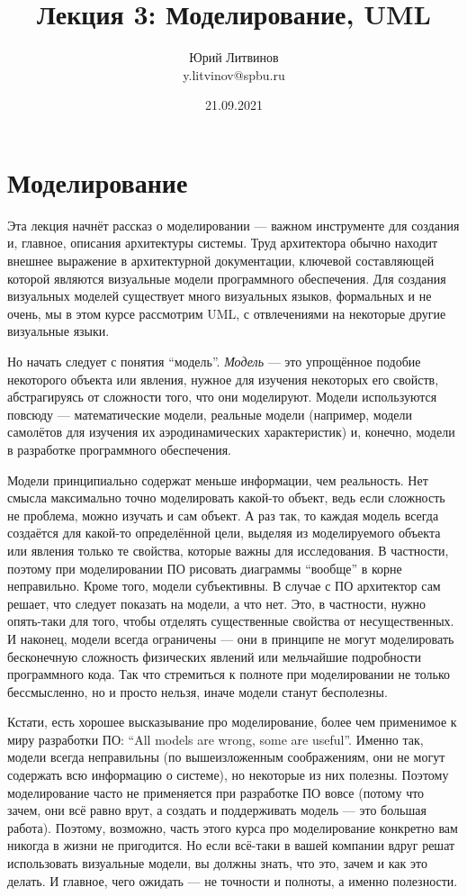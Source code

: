 \documentclass[a5paper]{article}
\title{Лекция 3: Моделирование, UML}
\author{Юрий Литвинов\\\small{y.litvinov@spbu.ru}}
\date{21.09.2021}
\begin{document}
\maketitle
\thispagestyle{empty}

\section{Моделирование}

Эта лекция начнёт рассказ о моделировании --- важном инструменте для создания и, главное, описания архитектуры системы. Труд архитектора обычно находит внешнее выражение в архитектурной документации, ключевой составляющей которой являются визуальные модели программного обеспечения. Для создания визуальных моделей существует много визуальных языков, формальных и не очень, мы в этом курсе рассмотрим UML, с отвлечениями на некоторые другие визуальные языки.

Но начать следует с понятия ``модель''. \textit{Модель} --- это упрощённое подобие некоторого объекта или явления, нужное для изучения некоторых его свойств, абстрагируясь от сложности того, что они моделируют. Модели используются повсюду --- математические модели, реальные модели (например, модели самолётов для изучения их аэродинамических характеристик) и, конечно, модели в разработке программного обеспечения.

Модели принципиально содержат меньше информации, чем реальность. Нет смысла максимально точно моделировать какой-то объект, ведь если сложность не проблема, можно изучать и сам объект. А раз так, то каждая модель всегда создаётся для какой-то определённой цели, выделяя из моделируемого объекта или явления только те свойства, которые важны для исследования. В частности, поэтому при моделировании ПО рисовать диаграммы ``вообще'' в корне неправильно. Кроме того, модели субъективны. В случае с ПО архитектор сам решает, что следует показать на модели, а что нет. Это, в частности, нужно опять-таки для того, чтобы отделять существенные свойства от несущественных. И наконец, модели всегда ограничены --- они в принципе не могут моделировать бесконечную сложность физических явлений или мельчайшие подробности программного кода. Так что стремиться к полноте при моделировании не только бессмысленно, но и просто нельзя, иначе модели станут бесполезны.

Кстати, есть хорошее высказывание про моделирование, более чем применимое к миру разработки ПО: ``All models are wrong, some are useful''. Именно так, модели всегда неправильны (по вышеизложенным соображениям, они не могут содержать всю информацию о системе), но некоторые из них полезны. Поэтому моделирование часто не применяется при разработке ПО вовсе (потому что зачем, они всё равно врут, а создать и поддерживать модель --- это большая работа). Поэтому, возможно, часть этого курса про моделирование конкретно вам никогда в жизни не пригодится. Но если всё-таки в вашей компании вдруг решат использовать визуальные модели, вы должны знать, что это, зачем и как это делать. И главное, чего ожидать --- не точности и полноты, а именно полезности.
\end{document}
